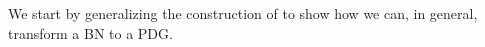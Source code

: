 \documentclass{article}
\theoremstyle{plain}
\theoremstyle{definition}
\theoremstyle{remark}
\numberwithin{equation}{section}
\begin{document}

We start by generalizing the construction of
 to show how we can, in general, transform a
BN to a PDG.
\end{document}
